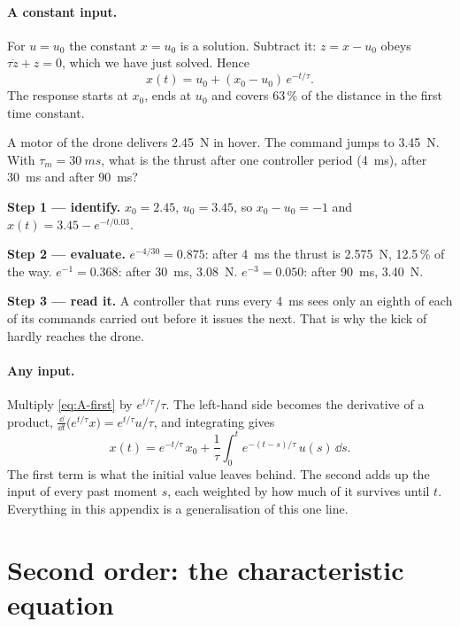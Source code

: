 \paragraph{A constant input.} For $u = u_0$ the constant $x = u_0$ is a solution. Subtract it: $z = x - u_0$ obeys $\tau\dot z + z = 0$, which we have just solved. Hence
\begin{equation}\label{eq:A-step}
  x(t) = u_0 + (x_0 - u_0)\,e^{-t/\tau} .
\end{equation}
The response starts at $x_0$, ends at $u_0$ and covers 63\,\% of the distance in the first time constant.

\begin{example}
\label{ex:A-motor}
A motor of the drone delivers \SI{2.45}{N} in hover. The command jumps to \SI{3.45}{N}. With $\tau_m = \SI{30}{ms}$, what is the thrust after one controller period (\SI{4}{ms}), after \SI{30}{ms} and after \SI{90}{ms}?

\textbf{Step 1 — identify.} $x_0 = 2.45$, $u_0 = 3.45$, so $x_0 - u_0 = -1$ and $x(t) = 3.45 - e^{-t/0.03}$.

\textbf{Step 2 — evaluate.} $e^{-4/30} = 0.875$: after \SI{4}{ms} the thrust is \SI{2.575}{N}, 12.5\,\% of the way. $e^{-1} = 0.368$: after \SI{30}{ms}, \SI{3.08}{N}. $e^{-3} = 0.050$: after \SI{90}{ms}, \SI{3.40}{N}.

\textbf{Step 3 — read it.} A controller that runs every \SI{4}{ms} sees only an eighth of each of its commands carried out before it issues the next. That is why the kick of  hardly reaches the drone.
\end{example}

\paragraph{Any input.} Multiply \cref{eq:A-first} by $e^{t/\tau}/\tau$. The left-hand side becomes the derivative of a product, $\frac{\dd}{\dd t}\big(e^{t/\tau}x\big) = e^{t/\tau}u/\tau$, and integrating gives
\begin{equation}\label{eq:A-conv1}
  x(t) = e^{-t/\tau}\,x_0 + \frac{1}{\tau}\int_0^t e^{-(t - s)/\tau}\,u(s)\,\dd s .
\end{equation}
The first term is what the initial value leaves behind. The second adds up the input of every past moment $s$, each weighted by how much of it survives until $t$. Everything in this appendix is a generalisation of this one line.

\section{Second order: the characteristic equation}

